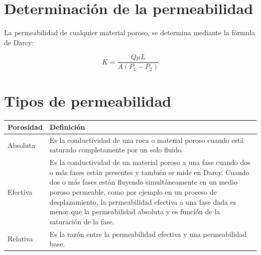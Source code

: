 \documentclass{article}
\begin{document}


\section{Determinaci\'on de la permeabilidad} %

\label{sec:form}


La permeabilidad de cualquier material poroso, se determina mediante la f\'ormula de Darcy:

\begin{equation}
{K} = \frac{Q\mu L}{A(P_{1}-P_{2})} 
\end{equation}



\section{Tipos de permeabilidad} %

\label{sec:tipos}
\begin{center}
\begin{tabular}{|p{}|p{}|}

\hline
\textbf{Porosidad} & \textbf{Definici\'on}\\
\hline
\hline

Absoluta  & Es la conductividad de una roca o material poroso cuando est\'a saturado completamente por un solo fluido.\\
Efectiva  & Es la conductividad de un material poroso a una fase cuando dos o m\'as fases est\'an presentes y tambi\'en se mide en Darcy. Cuando dos o m\'as
            fases est\'an fluyendo simult\'aneamente en un medio poroso permeable, como por ejemplo en un proceso de desplazamiento, la permeabilidad efectiva
             a una fase dada es menor que la permeabilidad absoluta y es funci\'on de la saturaci\'on de la fase.\\
Relativa  & Es la raz\'on entre la permeabilidad efectiva y una permeabilidad base.\\

\hline

\end{tabular}
\end{center}
\end{document}
